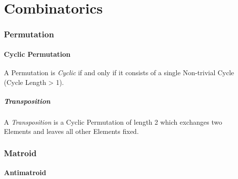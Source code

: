 \part{Combinatorics}\label{sec:combinatorics}

\section{Permutation}\label{sec:permutation}

\subsection{Cyclic Permutation}\label{sec:cyclic_permutation}

A Permutation is \emph{Cyclic} if and only if it consists of a single
Non-trivial Cycle (Cycle Length > 1).



\subsubsection{Transposition}\label{sec:transposition}

A \emph{Transposition} is a Cyclic Permutation of length 2 which
exchanges two Elements and leaves all other Elements fixed.



\section{Matroid}\label{sec:matroid}

\subsection{Antimatroid}\label{sec:antimatroid}



